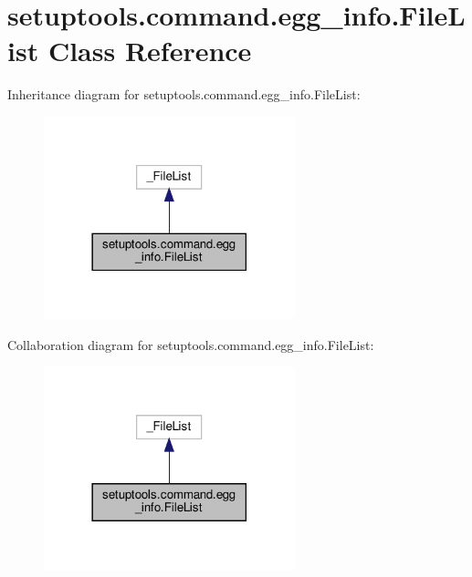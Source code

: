 \hypertarget{classsetuptools_1_1command_1_1egg__info_1_1FileList}{}\section{setuptools.\+command.\+egg\+\_\+info.\+File\+List Class Reference}
\label{classsetuptools_1_1command_1_1egg__info_1_1FileList}


Inheritance diagram for setuptools.\+command.\+egg\+\_\+info.\+File\+List\+:
\nopagebreak
\begin{figure}[H]
\begin{center}
\leavevmode
\includegraphics[width=206pt]{classsetuptools_1_1command_1_1egg__info_1_1FileList__inherit__graph}
\end{center}
\end{figure}


Collaboration diagram for setuptools.\+command.\+egg\+\_\+info.\+File\+List\+:
\nopagebreak
\begin{figure}[H]
\begin{center}
\leavevmode
\includegraphics[width=206pt]{classsetuptools_1_1command_1_1egg__info_1_1FileList__coll__graph}
\end{center}
\end{figure}
